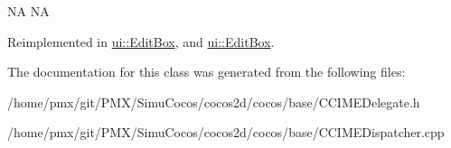 NA  NA 

Reimplemented in \hyperlink{classui_1_1EditBox_a5913b44adaf000a76cf35a126fbdeb31}{ui\+::\+Edit\+Box}, and \hyperlink{classui_1_1EditBox_abc522ffb60d7bb59404be9584fc1f60c}{ui\+::\+Edit\+Box}.



The documentation for this class was generated from the following files\+:\begin{DoxyCompactItemize}
\item 
/home/pmx/git/\+P\+M\+X/\+Simu\+Cocos/cocos2d/cocos/base/C\+C\+I\+M\+E\+Delegate.\+h\item 
/home/pmx/git/\+P\+M\+X/\+Simu\+Cocos/cocos2d/cocos/base/C\+C\+I\+M\+E\+Dispatcher.\+cpp\end{DoxyCompactItemize}
